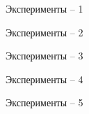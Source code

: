 \documentclass[10pt, dvipsnames]{beamer}
\begin{document}
\begin{frame}{Эксперименты -- 1}

\end{frame}

\begin{frame}{Эксперименты -- 2}

\end{frame}

\begin{frame}{Эксперименты -- 3}

\end{frame}

\begin{frame}{Эксперименты -- 4}

\end{frame}

\begin{frame}{Эксперименты -- 5}

\end{frame}
\end{document}
